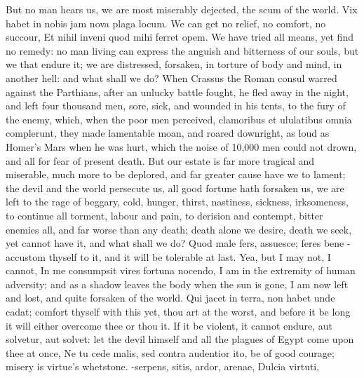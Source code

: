 {But no man hears us, we are most miserably dejected, the scum of the
world. Vix habet in nobis jam nova plaga locum. We can get no
relief, no comfort, no succour, Et nihil inveni quod mihi ferret
opem. We have tried all means, yet find no remedy: no man living can
express the anguish and bitterness of our souls, but we that endure it;
we are distressed, forsaken, in torture of body and mind, in another
hell: and what shall we do? When Crassus the Roman consul warred
against the Parthians, after an unlucky battle fought, he fled away in
the night, and left four thousand men, sore, sick, and wounded in his
tents, to the fury of the enemy, which, when the poor men perceived,
clamoribus et ululatibus omnia complerunt, they made lamentable moan,
and roared downright, as loud as Homer's Mars when he was hurt, which
the noise of 10,000 men could not drown, and all for fear of present
death. But our estate is far more tragical and miserable, much more to
be deplored, and far greater cause have we to lament; the devil and the
world persecute us, all good fortune hath forsaken us, we are left to
the rage of beggary, cold, hunger, thirst, nastiness, sickness,
irksomeness, to continue all torment, labour and pain, to derision and
contempt, bitter enemies all, and far worse than any death; death alone
we desire, death we seek, yet cannot have it, and what shall we do?
Quod male fers, assuesce; feres bene -accustom thyself to it, and it
will be tolerable at last. Yea, but I may not, I cannot, In me
consumpsit vires fortuna nocendo, I am in the extremity of human
adversity; and as a shadow leaves the body when the sun is gone, I am
now left and lost, and quite forsaken of the world. Qui jacet in terra,
non habet unde cadat; comfort thyself with this yet, thou art at the
worst, and before it be long it will either overcome thee or thou it.
If it be violent, it cannot endure, aut solvetur, aut solvet: let the
devil himself and all the plagues of Egypt come upon thee at once, Ne
tu cede malis, sed contra audentior ito, be of good courage; misery is
virtue's whetstone.
-serpens, sitis, ardor, arenae,
Dulcia virtuti,

}
